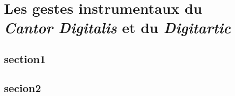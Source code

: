 \chapter{Les gestes instrumentaux du \textit{Cantor Digitalis} et du \textit{Digitartic}}
\label{Sec:jeux}
\minitoc
\cleardoublepage


\section{section1}
\lipsum[1-2]
\section{secion2}
\lipsum[1-2]